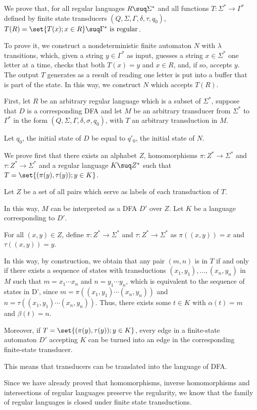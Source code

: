 \documentclass[11pt]{scrartcl}
\begin{document}
\begin{soln}
  \hfill

  We prove that, for all regular languages $R\suq \Sigma^{*}$ and all
  functions $T: \Sigma^{*}\to \Gamma^{*}$ defined by finite state
  transducers $(Q, \Sigma, \Gamma, \delta, \tau, q_0 )$,
  $T (R) = \set{T(x);x \in R} \suq \Gamma^{*} \text{ is regular}$.

  To prove it, we construct a nondeterministic finite automaton $N$
  with $\lambda$ transitions, which, given a string $y\in \Gamma^{*}$
  as input, guesses a string $x\in \Sigma^{*}$ one letter at a time,
  checks that both $T (x) = y$ and $x \in R$, and, if so, accepts
  $y$. The output $T$ generates as a result of reading one letter is
  put into a buffer that is part of the state. In this way, we
  construct $N$ which accepts $T(R)$.

  First, let $R$ be an arbitrary regular language which is a subset of
  $\Sigma^{*}$, suppose that $D$ is a corresponding DFA and let $M$ be
  an arbitrary transducer from $\Sigma^{*}$ to $\Gamma^{*}$ in the
  form $(Q, \Sigma, \Gamma, \delta, \sigma, q_0 )$, with $T$ an arbitrary transduction in $M$.

  Let $q_0$, the initial state of $D$ be equal to $q'_0$, the initial
  state of $N$.

  We prove first that there exists an alphabet $Z$, homomorphisms
  $\pi: Z^{*}\to \Sigma^{*}$ and $\tau: Z^{*}\to \Sigma^{*}$ and a
  regular language $K \suq Z^{*}$ such that
  $T=\set{(\pi(y), \tau(y));y\in K}$.

  Let $Z$ be a set of all pairs which serve as labels of each
  transduction of $T$.

  In this way, $M$ can be interpreted as a DFA $D'$ over $Z$. Let $K$
  be a language corresponding to $D'$.

  For all $(x, y)\in Z$, define $\pi: Z^{*}\to \Sigma^{*}$ and
  $\tau: Z^{*}\to \Sigma^{*}$ as $\pi((x,y)) = x$ and
  $\tau((x, y)) = y$.

  In this way, by construction, we obtain that any pair $(m, n)$ is in
  $T$ if and only if there exists a sequence of states with
  transductions $(x_1, y_1), \dots, (x_n, y_n)$ in $M$ such that
  $ m =x_1\cdots x_n$ and $n = y_1\cdots y_n$, which is equivalent to
  the sequence of states in D', since
  $m = \pi((x_1, y_1)\cdots(x_n,y_n))$ and
  $n = \tau((x_1,y_1)\cdots(x_n, y_{n}))$. Thus, there exists some
  $t\in K$ with $\alpha(t) = m$ and $\beta(t) = n$.

  Moreover, if $T = \set{(\pi(y), \tau(y));y\in K}$, every edge in a
  finite-state automaton $D'$ accepting $K$ can be turned into an edge
  in the corresponding finite-state transducer.

  This means that transducers can be translated into the language of
  DFA.

  Since we have already proved that homomorphisms, inverse homomorphisms and intersections of regular languages preserve the regularity, we know that the family of regular languages is closed under finite state transductions.
\end{soln}
\end{document}

